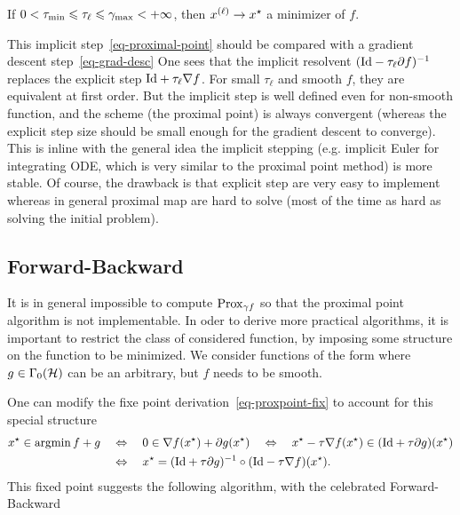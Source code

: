 \begin{thm}
	If $0<\tau_{\min} \leq \tau_\ell \leq \ga_{\max} < +\infty$, then $\it{x} \rightarrow x^\star$ a minimizer of $f$.
\end{thm}

This implicit step~\eqref{eq-proximal-point} should be compared with a gradient descent step~\eqref{eq-grad-desc}
One sees that the implicit resolvent $(\Id-\tau_\ell \partial f)^{-1}$ replaces the explicit step $\Id+\tau_\ell \nabla f$. For small $\tau_\ell$ and smooth $f$, they are equivalent at first order. But the implicit step is well defined even for non-smooth function, and the scheme (the proximal point) is always convergent (whereas the explicit step size should be small enough for the gradient descent to converge). This is inline with the general idea the implicit stepping (e.g. implicit Euler for integrating ODE, which is very similar to the proximal point method) is more stable. Of course, the drawback is that explicit step are very easy to implement whereas in general proximal map are hard to solve (most of the time as hard as solving the initial problem).


\subsection{Forward-Backward}
\label{sec-fb}

It is in general impossible to compute $\Prox_{\ga f}$ so that the proximal point algorithm is not implementable.
%
In oder to derive more practical algorithms, it is important to restrict the class of considered function, by imposing some structure on the function to be minimized. We consider functions of the form
where $g \in \Ga_0(\Hh)$ can be an arbitrary, but $f$ needs to be smooth.

One can modify the fixe point derivation~\eqref{eq-proxpoint-fix} to account for this special structure
\begin{align*}
 	x^\star \in \argmin f + g
	& \quad\Leftrightarrow\quad
	0 \in \nabla f(x^\star) + \partial g(x^\star) 
	\quad\Leftrightarrow\quad
	x^\star - \tau \nabla f(x^\star) \in (\Id+\tau \partial g)(x^\star) \\
	& \quad\Leftrightarrow\quad
	x^\star = ( \Id + \tau \partial g )^{-1} \circ ( \Id - \tau \nabla f ) (x^\star).
\end{align*}
This fixed point suggests the following algorithm, with the celebrated Forward-Backward


